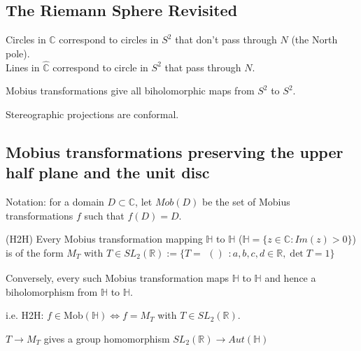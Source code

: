 \subsection{The Riemann Sphere Revisited}

Circles in $\hat{\mathbb{C}}$ correspond to circles in $S^2$ that don't pass through $N$ (the North pole).
\\
Lines in $\hat{\mathbb{C}}$ correspond to circle in $S^2$ that pass through $N$.

\begin{remark}
	Mobius transformations give all biholomorphic maps from $S^2$ to $S^2$.
\end{remark}

\begin{remark}
	Stereographic projections are conformal.
\end{remark}

\subsection{Mobius transformations preserving the upper half plane and the unit disc}

Notation: for a domain $D \subset \mathbb{C}$, let $Mob(D)$ be the set of Mobius transformations $f$ such that $f(D) = D$.

\begin{proposition}
	(H2H) Every Mobius transformation mapping $\mathbb{H}$ to $\mathbb{H}$ ($\mathbb{H} = \{ z \in \mathbb{C}: Im(z) > 0\}$) is of the form $M_T$ with $T \in SL_2 (\mathbb{R}) := \{T = \begin{matrix}
		()
	\end{matrix}: a, b, c, d \in \mathbb{R}, \det T = 1\}$
	
	Conversely, every such Mobius transformation maps $\mathbb{H}$ to $\mathbb{H}$ and hence a biholomorphism from $\mathbb{H}$ to $\mathbb{H}$.

	i.e. H2H: $f \in \text{Mob}(\mathbb{H}) \Leftrightarrow f = M_T$ with $T \in SL_2 (\mathbb{R})$.
\end{proposition}

\begin{remark}
	$T \rightarrow M_T$ gives a group homomorphism $SL_2 (\mathbb{R}) \rightarrow Aut(\mathbb{H})$
\end{remark}

